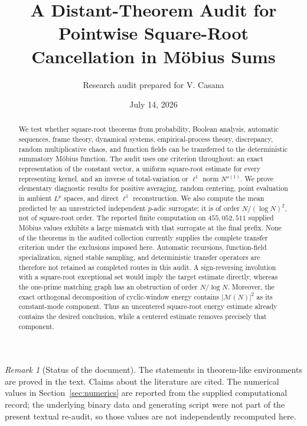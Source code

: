 \documentclass[11pt]{amsart}
\title[Distant square-root audit]{A Distant-Theorem Audit for Pointwise
Square-Root Cancellation in M\"obius Sums}
\author{Research audit prepared for V. Casana}
\date{July 14, 2026}
\numberwithin{equation}{section}
\theoremstyle{plain}
\theoremstyle{definition}
\theoremstyle{remark}
\newtheorem{remark}[theorem]{Remark}
\newcommand{\Mertens}{\mathcal M}
\begin{document}
\begin{abstract}
We test whether square-root theorems from probability, Boolean analysis,
automatic sequences, frame theory, dynamical systems, empirical-process
theory, discrepancy, random multiplicative chaos, and function fields can be
transferred to the deterministic summatory M\"obius function.  The audit uses
one criterion throughout: an exact representation of the constant vector,
a uniform square-root estimate for every representing kernel, and an inverse
of total-variation or \(\ell^1\) norm \(N^{o(1)}\).  We prove elementary
diagnostic results for positive averaging, random centering, point evaluation
in ambient \(L^p\) spaces, and direct \(\ell^1\) reconstruction.  We also
compute the mean predicted by an unrestricted independent \(p\)-adic surrogate;
it is of order \(N/(\log N)^2\), not of square-root order.  The reported
finite computation on \(455{,}052{,}511\) supplied M\"obius values exhibits a
large mismatch with that surrogate at the final prefix.  None of the theorems
in the audited collection currently supplies the complete transfer criterion
under the exclusions imposed here.  Automatic recursions, function-field
specialization, signed stable sampling, and deterministic transfer operators
are therefore not retained as completed routes in this audit.  A
sign-reversing involution with a square-root exceptional set would imply the
target estimate directly, whereas the one-prime matching graph has an
obstruction of order \(N/\log N\).  Moreover, the exact orthogonal
decomposition of cyclic-window energy contains \(|\Mertens(N)|^2\) as its
constant-mode component.  Thus an uncentered square-root energy estimate
already contains the desired conclusion, while a centered estimate removes
precisely that component.
\end{abstract}

\maketitle
\tableofcontents

\bigskip

\begin{remark}[Status of the document]
\label{rem:document-status}
The statements in theorem-like environments are proved in the text.  Claims
about the literature are cited.  The numerical values in
Section~\ref{sec:numerics} are reported from the supplied computational record;
the underlying binary data and generating script were not part of the present
textual re-audit, so those values are not independently recomputed here.
\end{remark}
\end{document}
